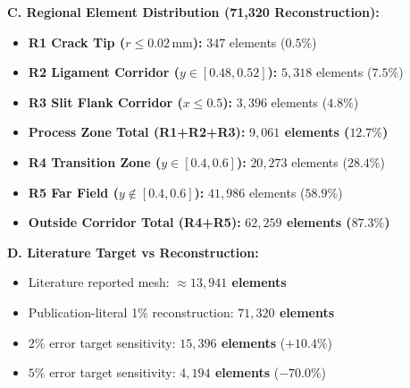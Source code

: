 \documentclass[10pt,a4paper]{article}
\begin{document}
\begin{minipage}[t]{0.485\textwidth}
  \textbf{\footnotesize C. Regional Element Distribution (71,320 Reconstruction):}
  \begin{itemize}[noitemsep,topsep=1pt,leftmargin=4mm]
    \scriptsize
    \item \textbf{R1 Crack Tip ($r \le 0.02\,\mathrm{mm}$):} $347$ elements ($0.5\%$)
    \item \textbf{R2 Ligament Corridor ($y \in [0.48, 0.52]$):} $5{,}318$ elements ($7.5\%$)
    \item \textbf{R3 Slit Flank Corridor ($x \le 0.5$):} $3{,}396$ elements ($4.8\%$)
    \item \textbf{Process Zone Total (R1+R2+R3):} \textbf{$9{,}061$ elements ($12.7\%$)}
    \item \textbf{R4 Transition Zone ($y \in [0.4, 0.6]$):} $20{,}273$ elements ($28.4\%$)
    \item \textbf{R5 Far Field ($y \notin [0.4, 0.6]$):} $41{,}986$ elements ($58.9\%$)
    \item \textbf{Outside Corridor Total (R4+R5):} \textbf{$62{,}259$ elements ($87.3\%$)}
  \end{itemize}
  \vspace{0.3em}
  \textbf{\footnotesize D. Literature Target vs Reconstruction:}
  \begin{itemize}[noitemsep,topsep=1pt,leftmargin=4mm]
    \scriptsize
    \item Literature reported mesh: \textbf{$\approx 13{,}941$ elements}
    \item Publication-literal 1\% reconstruction: \textbf{$71{,}320$ elements}
    \item $2\%$ error target sensitivity: \textbf{$15{,}396$ elements} ($+10.4\%$)
    \item $5\%$ error target sensitivity: \textbf{$4{,}194$ elements} ($-70.0\%$)
  \end{itemize}
\end{minipage}
\end{document}
